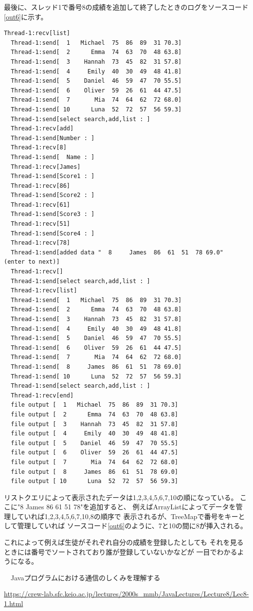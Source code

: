 \documentclass[dvipdfmx]{jsarticle}
\begin{document}
最後に、スレッド1で番号8の成績を追加して終了したときのログをソースコード\ref{out6}に示す。
\begin{lstlisting}[caption=番号がバラバラに追加されるときの処理,label=out6]
  Thread-1:recv[list]
  Thread-1:send[  1   Michael  75  86  89  31 70.3]
  Thread-1:send[  2      Emma  74  63  70  48 63.8]
  Thread-1:send[  3    Hannah  73  45  82  31 57.8]
  Thread-1:send[  4     Emily  40  30  49  48 41.8]
  Thread-1:send[  5    Daniel  46  59  47  70 55.5]
  Thread-1:send[  6    Oliver  59  26  61  44 47.5]
  Thread-1:send[  7       Mia  74  64  62  72 68.0]
  Thread-1:send[ 10      Luna  52  72  57  56 59.3]
  Thread-1:send[select search,add,list : ]
  Thread-1:recv[add]
  Thread-1:send[Number : ]
  Thread-1:recv[8]
  Thread-1:send[  Name : ]
  Thread-1:recv[James]
  Thread-1:send[Score1 : ]
  Thread-1:recv[86]
  Thread-1:send[Score2 : ]
  Thread-1:recv[61]
  Thread-1:send[Score3 : ]
  Thread-1:recv[51]
  Thread-1:send[Score4 : ]
  Thread-1:recv[78]
  Thread-1:send[added data "  8     James  86  61  51  78 69.0"  (enter to next)]
  Thread-1:recv[]
  Thread-1:send[select search,add,list : ]
  Thread-1:recv[list]
  Thread-1:send[  1   Michael  75  86  89  31 70.3]
  Thread-1:send[  2      Emma  74  63  70  48 63.8]
  Thread-1:send[  3    Hannah  73  45  82  31 57.8]
  Thread-1:send[  4     Emily  40  30  49  48 41.8]
  Thread-1:send[  5    Daniel  46  59  47  70 55.5]
  Thread-1:send[  6    Oliver  59  26  61  44 47.5]
  Thread-1:send[  7       Mia  74  64  62  72 68.0]
  Thread-1:send[  8     James  86  61  51  78 69.0]
  Thread-1:send[ 10      Luna  52  72  57  56 59.3]  
  Thread-1:send[select search,add,list : ]
  Thread-1:recv[end]
  file output [  1   Michael  75  86  89  31 70.3]
  file output [  2      Emma  74  63  70  48 63.8]
  file output [  3    Hannah  73  45  82  31 57.8]
  file output [  4     Emily  40  30  49  48 41.8]
  file output [  5    Daniel  46  59  47  70 55.5]
  file output [  6    Oliver  59  26  61  44 47.5]
  file output [  7       Mia  74  64  62  72 68.0]
  file output [  8     James  86  61  51  78 69.0]
  file output [ 10      Luna  52  72  57  56 59.3]  
\end{lstlisting}

リストクエリによって表示されたデータは1,2,3,4,5,6,7,10の順になっている。
ここに"8 James 86 61 51 78"を追加すると、
例えばArrayListによってデータを管理していれば1,2,3,4,5,6,7,10,8の順序で
表示されるが、TreeMapで番号をキーとして管理していれば
ソースコード\ref{out6}のように、7と10の間に8が挿入される。

これによって例えば生徒がそれぞれ自分の成績を登録したとしても
それを見るときには番号でソートされており誰が登録していないかなどが
一目でわかるようになる。

\begin{thebibliography}{10}
  　Javaプログラムにおける通信のしくみを理解する

  \url{https://crew-lab.sfc.keio.ac.jp/lectures/2000s_mmb/JavaLectures/Lecture8/Lec8-1.html}
\end{thebibliography}
\end{document}
